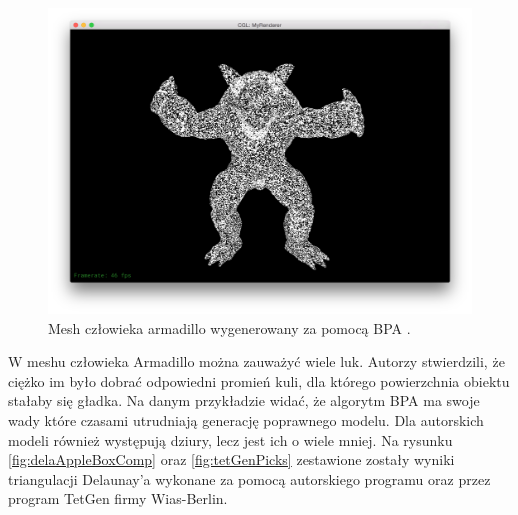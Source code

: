\begin{figure}[H]
  \centering
  \includegraphics[scale=0.3]{armadilloBpa.png}
  \caption{Mesh człowieka armadillo wygenerowany za pomocą BPA \cite{bpaGit}.}   
  \label{fig:armadillo}
\end{figure}
W meshu człowieka Armadillo można zauważyć wiele luk. Autorzy stwierdzili, że ciężko im było dobrać odpowiedni promień kuli, dla którego powierzchnia obiektu stałaby się gładka. Na danym przykładzie widać, że algorytm BPA ma swoje wady które czasami utrudniają generację poprawnego modelu. Dla autorskich modeli również występują dziury, lecz jest ich o wiele mniej.
\newline \indent Na rysunku \ref{fig:delaAppleBoxComp} oraz \ref{fig:tetGenPicks} zestawione zostały wyniki triangulacji Delaunay'a wykonane za pomocą autorskiego programu oraz przez program TetGen firmy Wias-Berlin.

